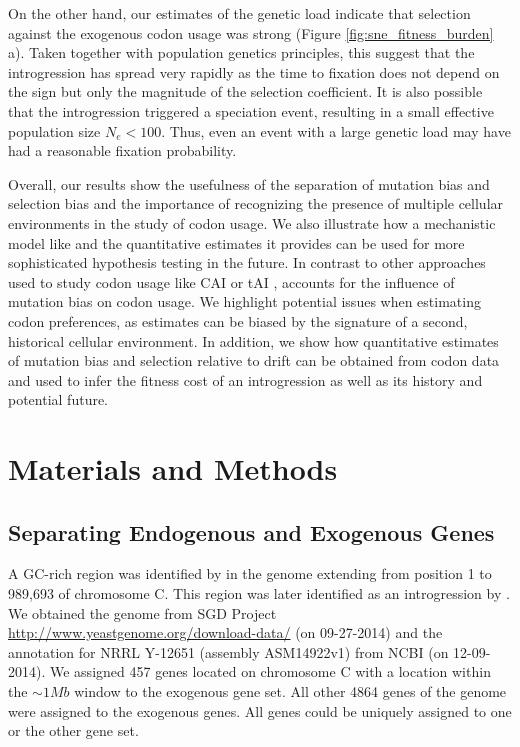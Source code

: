 On the other hand, our estimates of the genetic load indicate that selection against the exogenous codon usage was strong (Figure \ref{fig:sne_fitness_burden} a). 
Taken together with population genetics principles, this suggest that the introgression has spread very rapidly as the time to fixation does not depend on the sign but only the magnitude of the selection coefficient.
It is also possible that the introgression triggered a speciation event, resulting in a small effective population size $N_e < 100$.
Thus, even an event with a large genetic load may have had a reasonable fixation probability.
 
Overall, our results show the usefulness of the separation of mutation bias and selection bias and the importance of recognizing the presence of multiple cellular environments in the study of codon usage.
We also illustrate how a mechanistic model like \ROC and the quantitative estimates it provides can be used for more sophisticated hypothesis testing in the future.
In contrast to other approaches used to study codon usage like CAI \citep{sharp1987} or tAI \citep{dosreis2003, dosreis2004}, \ROC accounts for the influence of mutation bias on codon usage.
We highlight potential issues when estimating codon preferences, as estimates can be biased by the signature of a second, historical cellular environment.
In addition, we show how quantitative estimates of mutation bias and selection relative to drift can be obtained from codon data and used to infer the fitness cost of an introgression as well as its history and potential future.


\section{Materials and Methods}

\subsection{Separating Endogenous and Exogenous Genes}
A GC-rich region was identified by \citet{payen2009} in the \kluyveri genome extending from position 1 to 989,693 of chromosome C.
This region was later identified as an introgression by \citet{friedrich2015}.
We obtained the \kluyveri genome from SGD Project \url{http://www.yeastgenome.org/download-data/} (on 09-27-2014) and the annotation for \kluyveri NRRL Y-12651 (assembly ASM14922v1) from NCBI (on 12-09-2014).
We assigned 457 genes located on chromosome C with a location within the $\sim 1 Mb$ window to the exogenous gene set.
All other 4864 genes of the \kluyveri genome were assigned to the exogenous genes.
All genes could be uniquely assigned to one or the other gene set.


